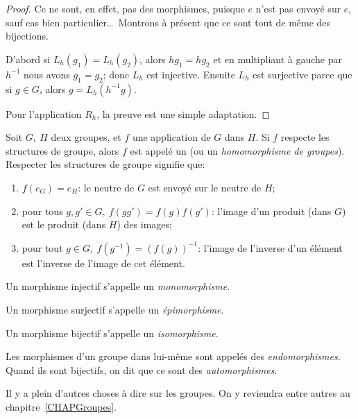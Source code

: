 \begin{proof}
    Ce ne sont, en effet, pas des morphismes, puisque \(e \) n'est pas envoyé sur \(e \), sauf cas bien particulier\dots\ Montrons à présent que ce sont tout de même des bijections.

    D'abord si \( L_h(g_1)=L_h(g_2)\), alors \( hg_1=hg_2\) et en multipliant à gauche par \( h^{-1}\) nous avons \( g_1=g_2\); donc \( L_h\) est injective. Ensuite \( L_h\) est surjective parce que si \( g\in G\), alors \( g=L_h(h^{-1} g)\).

    Pour l'application \( R_h\), la preuve est une simple adaptation.
\end{proof}

\begin{definition}
    Soit \(G,\ H\) deux groupes, et \(f \) une application de \(G \) dans \(H \). Si \(f \) respecte les structures de groupe, alors \(f \) est appelé un  (ou un \emph{homomorphisme de groupes}). Respecter les structures de groupe signifie que:
    \begin{enumerate}
    \item \( f(e_G) = e_H \): le neutre de \( G \) est envoyé sur le neutre de \( H \);
    \item pour tous \(g, g' \in G,\ f(gg') = f(g)f(g')\): l'image d'un produit (dans \(G \)) est le produit (dans \( H \)) des images;
    \item pour tout \(g \in G,\ f(g^{-1}) = \left(f(g)\right)^{-1}\): l'image de l'inverse d'un élément est l'inverse de l'image de cet élément.
    \end{enumerate}
\end{definition}

\begin{definition}\label{DEFGroupesTypesdeMorphismes}
Un morphisme injectif s'appelle un \emph{monomorphisme}.

Un morphisme surjectif s'appelle un \emph{épimorphisme}.

Un morphisme bijectif s'appelle un \emph{isomorphisme}.

Les morphismes d'un groupe dans lui-même sont appelés des \emph{endomorphismes}. Quand ils sont bijectifs, on dit que ce sont des \emph{automorphismes}.
\end{definition}

Il y a plein d'autres choses à dire sur les groupes. On y reviendra entre autres au chapitre~\ref{CHAPGroupes}.

